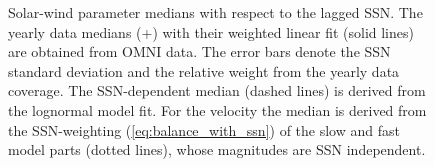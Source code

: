 \documentclass[]{aa}
\begin{document}
        \begin{figure}
                \caption{Solar-wind parameter medians with respect to the lagged SSN. The yearly data medians (+) with their weighted linear fit (solid lines) are obtained from OMNI data. The error bars denote the SSN standard deviation and the relative weight from the yearly data coverage. The SSN-dependent median (dashed lines) is derived from the lognormal model fit. For the velocity the median is derived from the SSN-weighting (\ref{eq:balance_with_ssn}) of the slow and fast model parts (dotted lines), whose magnitudes are SSN independent.}
                \label{fig:OMNI_yearly_BVNTvsSSN_a}
        \end{figure}
\end{document}
